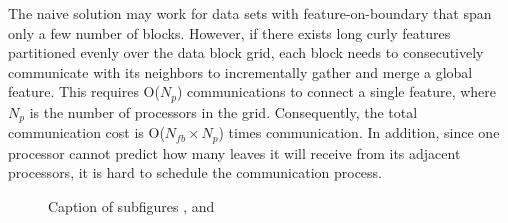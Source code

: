 \documentclass[10pt, conference, compsocconf]{IEEEtran}
\begin{document}
The naive solution may work for data sets with feature-on-boundary that span only a few number of blocks. However, if there exists long curly features partitioned evenly over the data block grid, each block needs to consecutively communicate with its neighbors to incrementally gather and merge a global feature. This requires O(${N_p}$) communications to connect a single feature, where ${N_p}$ is the number of processors in the grid. Consequently, the total communication cost is O(${N_{fb} \times N_p}$) times communication. In addition, since one processor cannot predict how many leaves it will receive from its adjacent processors, it is hard to schedule the communication process. 

\begin{figure}[ht]
  \centering
  \caption[Optional caption for list of figures]{Caption of subfigures ,  and }
\end{figure}
\end{document}
